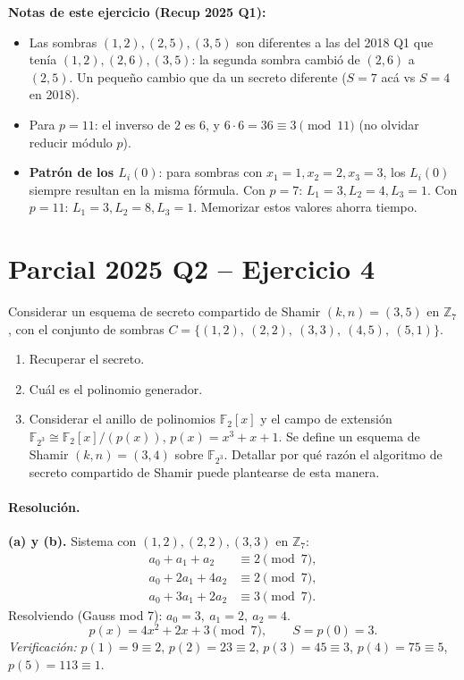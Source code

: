\documentclass[11pt,a4paper]{article}
\begin{document}
\begin{tipsbox}
\textbf{Notas de este ejercicio (Recup 2025 Q1):}
\begin{itemize}
  \item Las sombras $(1,2),(2,5),(3,5)$ son diferentes a las del 2018 Q1 que tenía $(1,2),(2,6),(3,5)$: la segunda sombra cambió de $(2,6)$ a $(2,5)$. Un pequeño cambio que da un secreto diferente ($S=7$ acá vs $S=4$ en 2018).
  \item Para $p=11$: el inverso de $2$ es $6$, y $6\cdot 6=36\equiv 3\pmod{11}$ (no olvidar reducir módulo $p$).
  \item \textbf{Patrón de los $L_i(0)$}: para sombras con $x_1=1, x_2=2, x_3=3$, los $L_i(0)$ siempre resultan en la misma fórmula. Con $p=7$: $L_1=3, L_2=4, L_3=1$. Con $p=11$: $L_1=3, L_2=8, L_3=1$. Memorizar estos valores ahorra tiempo.
\end{itemize}
\end{tipsbox}

\section{Parcial 2025 Q2 -- Ejercicio 4}
\label{sec:2025Q2}

\begin{consignabox}
Considerar un esquema de secreto compartido de Shamir $(k,n)=(3,5)$ en $\mathbb{Z}_7$, con el conjunto de sombras $C = \{(1,2),\ (2,2),\ (3,3),\ (4,5),\ (5,1)\}$.
\begin{enumerate}
  \item[a)] Recuperar el secreto.
  \item[b)] Cuál es el polinomio generador.
  \item[c)] Considerar el anillo de polinomios $\mathbb{F}_2[x]$ y el campo de extensión $\mathbb{F}_{2^3} \cong \mathbb{F}_2[x]/(p(x))$, $p(x)=x^3+x+1$. Se define un esquema de Shamir $(k,n)=(3,4)$ sobre $\mathbb{F}_{2^3}$. Detallar por qué razón el algoritmo de secreto compartido de Shamir puede plantearse de esta manera.
\end{enumerate}
\end{consignabox}

\paragraph{Resolución.}

\textbf{(a) y (b).} Sistema con $(1,2),(2,2),(3,3)$ en $\mathbb{Z}_7$:
\begin{align*}
  a_0 + a_1 + a_2 &\equiv 2 \pmod 7,\\
  a_0 + 2a_1 + 4a_2 &\equiv 2 \pmod 7,\\
  a_0 + 3a_1 + 2a_2 &\equiv 3 \pmod 7.
\end{align*}
Resolviendo (Gauss mod 7): $a_0 = 3,\ a_1 = 2,\ a_2 = 4$.
\[
  \boxed{p(x) = 4x^2 + 2x + 3 \pmod 7}, \qquad S = p(0) = \boxed{3}.
\]
\emph{Verificación:} $p(1)=9\equiv2$, $p(2)=23\equiv2$, $p(3)=45\equiv3$, $p(4)=75\equiv5$, $p(5)=113\equiv1$. \checkmark
\end{document}
